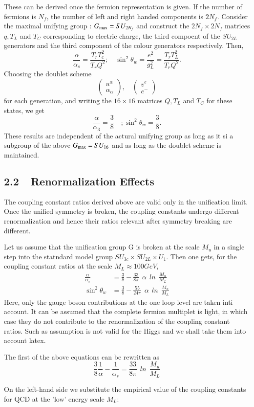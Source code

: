 These can be derived once the fermion representation is given. If the number of fermions is $N_{f}$, the number of left and right handed components is $2N_{f}$. Consider the maximal unifying group : $G_{\rm max} =SU_{2N_{f}}$ and construct the $2N_{f} \times 2N_{f}$ matrices $q, T_{L}$ and $T_{C}$ corresponding to electric charge, the third compoent of the $SU_{2L}$ generators and the third component of the colour generators respectively. Then,
$$
\frac{\alpha}{\alpha_{s}} = \frac{T_{r} T_{c}^{2}}{T_{r} Q^{2}} ; \quad \sin^{2} \theta_{w} = \frac{e^{2}}{g^{2}_{L}} = \frac{T_{r} T_{L}^{2}}{T_{r} Q^{2}}.
$$
Choosing the doublet scheme
\begin{equation*}
\begin{pmatrix}
u^{\alpha} \\ \alpha_{\alpha}
\end{pmatrix}
, \quad 
\begin{pmatrix}
v^{e} \\ e^{-}
\end{pmatrix}
\end{equation*}
for each generation, and writing the $16 \times 16$ matrices $Q, T_{L}$ and $T_{C}$ for these states, we get
$$
\frac{\alpha}{\alpha_{3}} = \frac{3}{8}\quad ; \sin^{2} \theta_{w} = \frac{3}{8}.
$$
These results are independent of the actural unifying group as long as it si a subgroup of the above $G_{\rm max} = SU_{16}$ and as long as the doublet scheme is maintained.

\subsection{2.2~~Renormalization Effects}\label{subsec-2.2}

The coupling constant ratios derived above are valid only in the unification limit. Once the unified symmetry is broken, the coupling constants undergo different renormalization and hence their ratios relevant after symmetry breaking are different.

Let us assume that the unification group G is broken at the scale $M_{u}$ in a single step into the statndard model group $SU_{3c} \times SU_{2L} \times U_{1}$. Then one gets, for the coupling constant ratios at the scale $M_{L} \approx 100 GeV$,
\begin{align*}
\frac{\alpha}{ \alpha_{s}} &= \frac{3}{8} - \frac{33}{8 \pi}~~ \alpha~~ ln~~ \frac{M_{u}}{M_{L}}\\
\sin^{2}\theta_{w} & = \frac{3}{8} - \frac{55}{24 \pi}~~ \alpha~~ ln~~ \frac{M_{u}}{M_{L}}
\end{align*}
Here, only the gauge boson contributions at the one loop level are taken inti account. It can be assumed that the complete fermion multiplet is light, in which case they do not contribute to the renormalization of the coupling constant ratios. Such as assumption is not valid for the Higgs and we shall take them into account latex.

The first of the above equations can be rewritten as
$$
\frac{3}{8} \frac{1}{\alpha} - \frac{1}{\alpha_{s}} = \frac{33}{8 \pi}~~ ln ~~ \frac{M_{u}}{M_{L}}
$$

On the left-hand side we substitute the empirical value of the coupling constants for QCD at the 'low' energy scale $M_{L}$:

